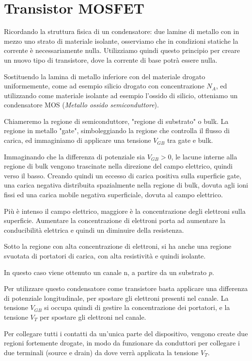 \documentclass[../template]{subfiles}
\begin{document}
\section{Transistor MOSFET}
Ricordando la struttura fisica di un condensatore: due lamine di metallo con in mezzo uno strato di materiale isolante, osserviamo che in condizioni statiche la corrente è necessariamente nulla.
Utilizziamo quindi questo principio per creare un nuovo tipo di transistore, dove la corrente di base potrà essere nulla.

Sostituendo la lamina di metallo inferiore con del materiale drogato uniformemente, come ad esempio silicio drogato con concentrazione $N_A$, ed utilizzando come materiale isolante ad esempio l'ossido di silicio, otteniamo un condensatore MOS (\textit{Metallo ossido semiconduttore}).

Chiameremo la regione di semiconduttore, "regione di substrato" o bulk. La regione in metallo "gate", simboleggiando la regione che controlla il flusso di carica, ed immaginiamo di applicare una tensione $V_{GB}$ tra gate e bulk.

Immaginando che la differenza di potenziale sia $V_{GB} > 0$, le lacune interne alla regione di bulk vengono trascinate nella direzione del campo elettrico, quindi verso il basso. Creando quindi un eccesso di carica positiva sulla superficie gate, una carica negativa distribuita spazialmente nella regione di bulk, dovuta agli ioni fissi ed una carica mobile negativa superficiale, dovuta al campo elettrico.

Più è intenso il campo elettrico, maggiore è la concentrazione degli elettroni sulla superficie. Aumentare la concentrazione di elettroni porta ad aumentare la conducibilità elettrica e quindi un diminuire della resistenza.

Sotto la regione con alta concentrazione di elettroni, si ha anche una regione svuotata di portatori di carica, con alta resistività e quindi isolante.

In questo caso viene ottenuto un canale n, a partire da un substrato $p$.

Per utilizzare questo condensatore come transistore basta applicare una differenza di potenziale longitudinale, per spostare gli elettroni presenti nel canale. La tensione $V_{GB}$ si occupa quindi di gestire la concentrazione dei portatori, e la tensione $V_T$ per spostare gli elettroni nel canale.


Per collegare tutti i contatti da un'unica parte del dispositivo, vengono create due regioni fortemente drogate, in modo da funzionare da conduttori per collegare i due terminali (source e drain) da dove verrà applicata la tensione $V_T$.
\end{document}

